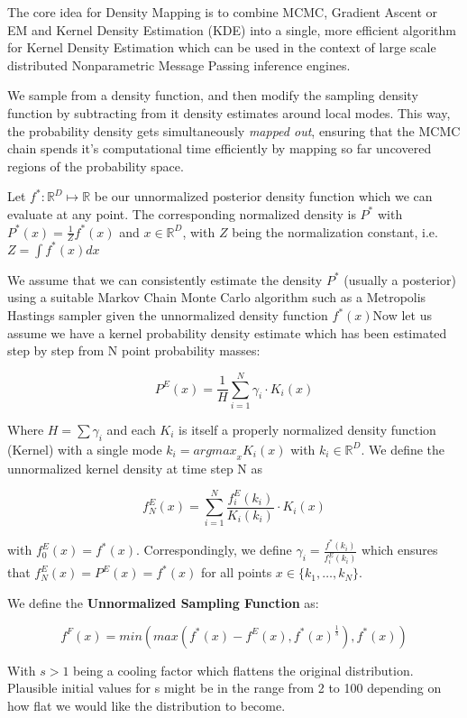 \documentclass[letterpaper,10pt,english]{/home/londenberg/python-env/clean/lib/python2.7/site-packages/sphinx/texinputs/sphinxhowto}
\begin{document}
The core idea for Density Mapping is to combine MCMC, Gradient Ascent or
EM and Kernel Density Estimation (KDE) into a single, more efficient
algorithm for Kernel Density Estimation which can be used in the context
of large scale distributed Nonparametric Message Passing inference
engines.

We sample from a density function, and then modify the sampling density
function by subtracting from it density estimates around local modes.
This way, the probability density gets simultaneously \emph{mapped out},
ensuring that the MCMC chain spends it's computational time efficiently
by mapping so far uncovered regions of the probability space.

Let $f^*: \mathbb{R}^D \mapsto \mathbb{R}$ be our unnormalized posterior
density function which we can evaluate at any point. The corresponding
normalized density is $P^*$ with $P^*(x) = \frac{1}{Z} f^*(x)$ and
$x \in \mathbb{R}^D$, with $Z$ being the normalization constant, i.e.
$Z = \int{f^*(x) dx}$

We assume that we can consistently estimate the density $P^*$ (usually a
posterior) using a suitable Markov Chain Monte Carlo algorithm such as a
Metropolis Hastings sampler given the unnormalized density function
$f^*(x)$Now let us assume we have a kernel probability density estimate which
has been estimated step by step from N point probability masses:

\[ 
P^{E}(x) = \frac{1}{H} \sum_{i=1}^{N} \gamma_i \cdot K_i(x)
\]

Where $H = \sum{\gamma_i}$ and each $K_i$ is itself a properly
normalized density function (Kernel) with a single mode
$k_i = {argmax}_{x} K_i(x)$ with $k_i \in \mathbb{R}^D$. We define the
unnormalized kernel density at time step N as

\[
f_N^E(x) =  \sum_{i=1}^{N} \frac{f_i^E(k_i)}{K_i(k_i)} \cdot K_i(x)
\]

with $f_0^E(x) = f^*(x)$. Correspondingly, we define
$\gamma_i = \frac{f^*(k_i)}{f_i^E(k_i)}$ which ensures that
$f_N^E(x) = P^{E}(x) = f^*(x)$ for all points
$x \in \{ k_1, \ldots, k_N \}$.

We define the \textbf{Unnormalized Sampling Function} as:

\[
f^F(x) = min(max(f^*(x)-f^E(x), f^*(x)^\frac{1}{s}), f^*(x))
\]

With $s > 1$ being a cooling factor which flattens the original
distribution. Plausible initial values for s might be in the range from
2 to 100 depending on how flat we would like the distribution to become.
\end{document}
